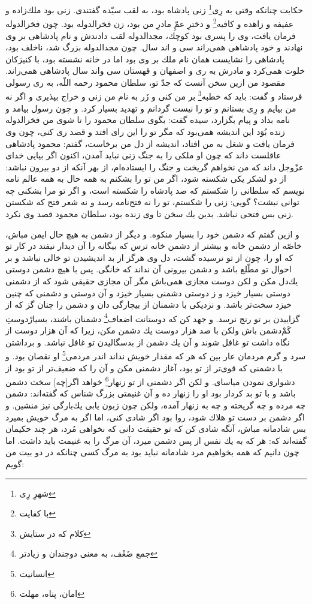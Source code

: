 حكايت چنانكه وقتى به رِى‌\footnote{شهرِ رِی} زنى پادشاه بود، به لقب سيّده گفتندى. زنى بود ملك‌زاده و عفيفه و زاهده و كافيه\footnote{با کفایت} و دخترِ عمّ‌ِ مادرِ من بود، زن فخرالدوله بود. چون فخرالدوله فرمان يافت، وى را پسرى بود كوچك، مجدالدوله لقب دادندش و نام پادشاهى بر وى نهادند و خود پادشاهى همى‌راند سى و اند سال. چون مجدالدوله بزرگ شد، ناخلف بود، پادشاهى را نشايست همان نام ملك بر وى بود اما در خانه نشسته بود، با كنيزكان خلوت همى‌كرد و مادرش به رى و اصفهان و قهستان سى واند سال پادشاهى همى‌راند. مقصود من ازين سخن آنست كه جدّ تو، سلطان محمود رحمه اللّه، به رى رسولى فرستاد و گفت: بايد كه خطبه\footnote{کلام که در ستایش} بر من كنى و زَر به نام من زنى و خراج بپذيرى و اگر نه من بيايم و رِی بستانم و تو را نيست گردانم و تهديد بسيار كرد. و چون رسول بيامد و نامه بداد و پيام بگزارد، سيده گفت: بگوى سلطان محمود را تا شوى من فخرالدوله زنده بُوَد اين انديشه همى‌بود كه مگر تو را اين راى افتد و قصد رى كنى، چون وى فرمان يافت و شغل به من افتاد، انديشه از دل من برخاست، گفتم: محمود پادشاهى عاقلست داند كه چون او ملكى را به جنگ زنى نبايد آمدن، اكنون اگر بيايى خداى عزّوجل داند كه من نخواهم گريخت و جنگ را ايستاده‌ام، از بهر آنكه از دو بيرون نباشد: از دو لشكر يكى شكسته شود، اگر من تو را بشكنم به همه حال به همه عالم نامه نويسم كه سلطانى را شكستم كه صد پادشاه را شكسته است، و اگر تو مرا بشكنى چه توانى نبشت‌؟ گويى: زنى را شكستم، تو را نه فتح‌نامه رسد و نه شعر فتح كه شكستن زنى بس فتحى نباشد. بدين يك سخن تا وى زنده بود، سلطان محمود قصد وى نكرد.

و ازين گفتم كه دشمن خود را بسيار منكوه. و ديگر از دشمن به هيچ حال ايمن مباش، خاصّه از دشمن خانه و بيشتر از دشمن خانه ترس كه بيگانه را آن ديدار نيفتد در كار تو كه او را، چون از تو ترسيده گشت، دل وى هرگز از بد انديشيدن تو خالى نباشد و بر احوال تو مطّلع باشد و دشمن بيرونى آن نداند كه خانگى. پس با هيچ دشمن دوستى يك‌دل مكن و لكن دوست مجازى همى‌باش مگر آن مجازى حقيقى شود كه از دشمنى دوستى بسيار خيزد و ز دوستى دشمنى بسيار خيزد و آن دوستى و دشمنى كه چنين خيزد سخت‌تر باشد. و نزديكى با دشمنان از بيچارگى دان و دشمن را چنان گز كه از گزاييدن بر تو رنج نرسد. و جهد كن كه دوستانت اضعاف\footnote{جمع ضَعْف، به معنی دوچندان و زیاد‌تر} دشمنان باشند، بسيارْدوستِ كَم‌ْدشمن باش ولكن با صد هزار دوست يك دشمن مكن، زيرا كه آن هزار دوست از نگاه داشت تو غافل شوند و آن يك دشمن از بدسگاليدن تو غافل نباشد. و برداشتن سرد و گرم مردمان عار بين که هر كه مقدار خويش نداند اندر مردمى\footnote{انسانیت} او نقصان بود. و با دشمنى كه قوى‌تر از تو بود، آغاز دشمنى مكن و آن را كه ضعيف‌تر از تو بود از دشوارى نمودن مياساى. و لكن اگر دشمنى از تو زنهار\footnote{امان، پناه، مهلت} خواهد اگر[چه] سخت دشمن باشد و با تو بد كردار بود او را زنهار ده و آن غنيمتى بزرگ شناس كه گفته‌اند: دشمن چه مرده و چه گريخته و چه به زنهار آمده، ولكن چون زبون يابى يك‌بارگى نيز منشين. و اگر دشمن بر دست تو هلاك شود، روا بود اگر شادى كنى، اما اگر به مرگ خويش بميرد بس شادمانه مباش، آنگه شادى كن كه تو حقيقت دانى كه نخواهى مُرد، هر چند حكيمان گفته‌اند كه: هر كه به يك نفس از پس دشمن ميرد، آن مرگ را به غنيمت بايد داشت. اما چون دانيم كه همه بخواهيم مرد شادمانه نبايد بود به مرگ  كسى چنانكه در دو بيت من گويم:

